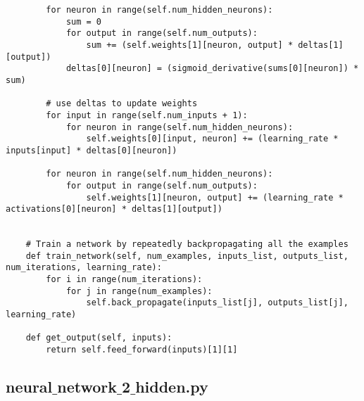 \documentclass[11pt]{article} %
\begin{document}
\begin{lstlisting}
        for neuron in range(self.num_hidden_neurons):
            sum = 0
            for output in range(self.num_outputs):
                sum += (self.weights[1][neuron, output] * deltas[1][output])
            deltas[0][neuron] = (sigmoid_derivative(sums[0][neuron]) * sum)
            
        # use deltas to update weights
        for input in range(self.num_inputs + 1):
            for neuron in range(self.num_hidden_neurons):
                self.weights[0][input, neuron] += (learning_rate * inputs[input] * deltas[0][neuron])
                
        for neuron in range(self.num_hidden_neurons):
            for output in range(self.num_outputs):
                self.weights[1][neuron, output] += (learning_rate * activations[0][neuron] * deltas[1][output])


    # Train a network by repeatedly backpropagating all the examples
    def train_network(self, num_examples, inputs_list, outputs_list, num_iterations, learning_rate):
        for i in range(num_iterations):
            for j in range(num_examples):
                self.back_propagate(inputs_list[j], outputs_list[j], learning_rate)  
                
    def get_output(self, inputs):
        return self.feed_forward(inputs)[1][1]
\end{lstlisting}

\subsection{neural$\_$network$\_$2$\_$hidden.py}
\end{document}
